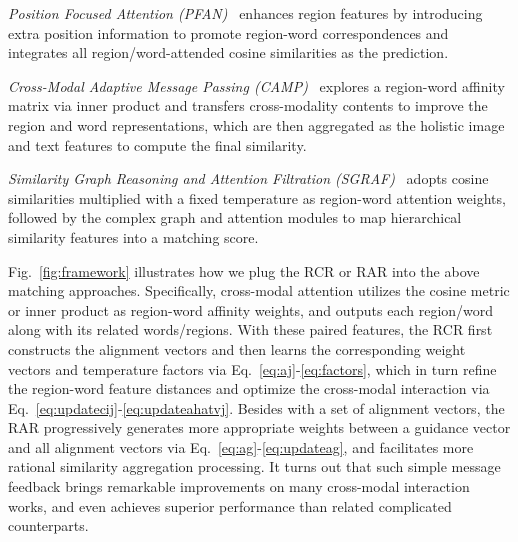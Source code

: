 \documentclass[journal]{IEEEtran}\newcommand{\ignore}[1]{}
\begin{document}
\textit{Position Focused Attention
(PFAN)}~\cite{PFAN} enhances region features by introducing extra position information to promote region-word correspondences and integrates all region/word-attended cosine similarities as the prediction.

\textit{Cross-Modal Adaptive Message Passing
(CAMP)}~\cite{CAMP} explores a region-word affinity matrix via inner product and transfers cross-modality contents to improve the region and word representations, which are then aggregated as the holistic image and text features to compute the final similarity.

\textit{Similarity Graph Reasoning and Attention Filtration (SGRAF)}~\cite{SGRAF} adopts cosine similarities multiplied with a fixed temperature as region-word attention weights, followed by the complex graph and attention modules to map hierarchical similarity features into a matching score.

Fig.~\ref{fig:framework} illustrates how we plug the RCR or RAR into the above matching approaches. Specifically, cross-modal attention utilizes the cosine metric or inner product as region-word affinity weights, and outputs each region/word along with its related words/regions. With these paired features, the RCR first constructs the alignment vectors and then learns the corresponding weight vectors and temperature factors via Eq.~\eqref{eq:aj}-\eqref{eq:factors}, which in turn refine the region-word feature distances and optimize the cross-modal interaction via Eq.~\eqref{eq:updatecij}-\eqref{eq:updateahatvj}. Besides with a set of alignment vectors, the RAR progressively generates more appropriate weights between a guidance vector and all alignment vectors via Eq.~\eqref{eq:ag}-\eqref{eq:updateag}, and facilitates more rational similarity aggregation processing. It turns out that such simple message feedback brings remarkable improvements on many cross-modal interaction works, and even achieves superior performance than related complicated counterparts.
\end{document}
